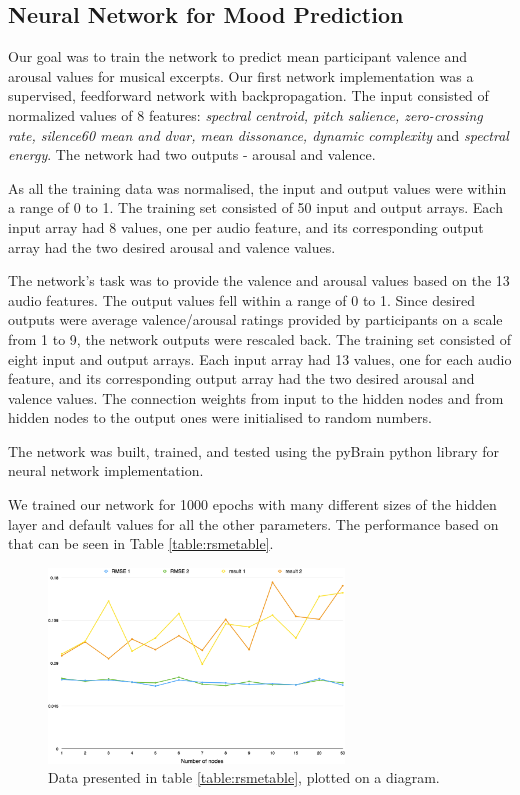 \vspace{10pt}

\subsection{Neural Network for Mood Prediction}

Our goal was to train the network to predict mean participant valence and arousal values for musical excerpts. 
Our first network implementation was a supervised, feedforward network with backpropagation. 
The input consisted of normalized values of 8 features:
\textit{spectral centroid, pitch salience, zero-crossing rate, silence60 mean  and dvar, mean dissonance, dynamic complexity} and \textit{spectral energy}. 
The network had two outputs - arousal and valence.

As all the training data was normalised, the input and output values were within a range of 0 to 1. The training set consisted of 50 input and output arrays. Each input array had 8 values, one per audio feature, and its corresponding output array had the two desired arousal and valence values.

The network’s task was to provide the valence and arousal values based on the 13 audio features. The output values fell within a range of 0 to 1. Since desired outputs were average valence/arousal ratings provided by participants on a scale from 1 to 9, the network outputs were rescaled back. The training set consisted of eight input and output arrays. Each input array had 13 values, one for each audio feature, and its corresponding output array had the two desired arousal and valence values. The connection weights from input to the hidden nodes and from hidden nodes to the output ones were initialised to random numbers. 

The network was built, trained, and tested using the pyBrain python library for neural network implementation. 

We trained our network for 1000 epochs with many different sizes of the hidden layer and default values for all the other parameters. The performance based on that can be seen in Table \ref{table:rsmetable}.

\begin{figure}[h]
	\centering
   \includegraphics[width=0.7\textwidth]{Figures/nodesperf}
\caption{Data presented in table \ref{table:rsmetable}, plotted on a diagram.}
\end{figure}


